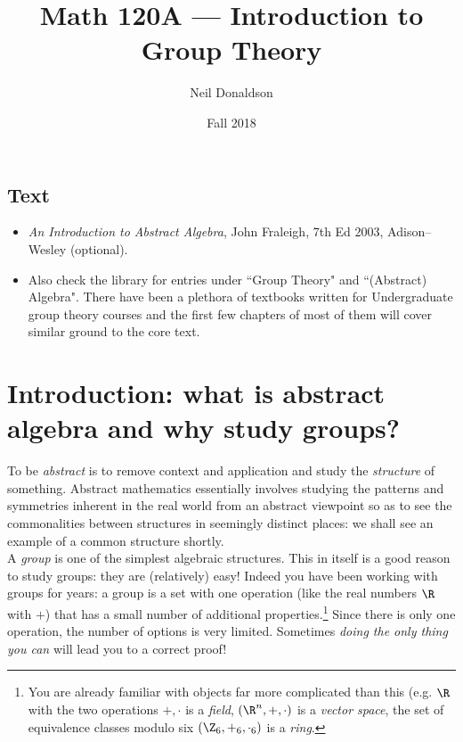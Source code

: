 \graphicspath{{notes/asy/}}
\thispagestyle{empty}

\title{Math 120A --- Introduction to Group Theory}
\author{Neil Donaldson}
\date{Fall 2018}
\maketitle 

\subsection*{Text}
\begin{itemize}
\item \emph{An Introduction to Abstract Algebra}, John Fraleigh, 7th Ed 2003, Adison--Wesley (optional).
\item Also check the library for entries under ``Group Theory" and ``(Abstract) Algebra". There have been a plethora of textbooks written for Undergraduate group theory courses and the first few chapters of most of them will cover similar ground to the core text. 
\end{itemize}

\section{Introduction: what is abstract algebra and why study groups?}

To be \emph{abstract} is to remove context and application and study the \emph{structure} of something. Abstract mathematics essentially involves studying the patterns and symmetries inherent in the real world from an abstract viewpoint so as to see the commonalities between structures in seemingly distinct places: we shall see an example of a common structure shortly.\\

A \emph{group} is one of the simplest algebraic structures. This in itself is a good reason to study groups: they are (relatively) easy! Indeed you have been working with groups for years: a group is a set with one operation (like the real numbers $\R$ with $+$) that has a small number of additional properties.\footnote{You are already familiar with objects far more complicated than this (e.g. $\R$ with the two operations $+,\cdot$ is a \emph{field}, $(\R^n,+,\cdot)$ is a \emph{vector space},  the set of equivalence classes modulo six $(\Z_6,+_6,\cdot_6)$ is a \emph{ring}.} Since there is only one operation, the number of options is very limited. Sometimes \emph{doing the only thing you can} will lead you to a correct proof!\\

